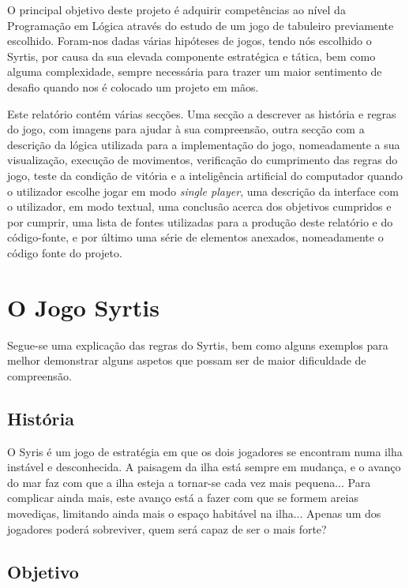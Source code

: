 \documentclass[a4paper]{article}
\begin{document}
O principal objetivo deste projeto é adquirir competências ao nível da Programação em Lógica através do estudo de um jogo de tabuleiro previamente escolhido. Foram-nos dadas várias hipóteses de jogos, tendo nós escolhido o Syrtis, por causa da sua elevada componente estratégica e tática, bem como alguma complexidade, sempre necessária para trazer um maior sentimento de desafio quando nos é colocado um projeto em mãos.

Este relatório contém várias secções. Uma secção a descrever as história e regras do jogo, com imagens para ajudar à sua compreensão, outra secção com a descrição da lógica utilizada para a implementação do jogo, nomeadamente a sua visualização, execução de movimentos, verificação do cumprimento das regras do jogo, teste da condição de vitória e a inteligência artificial do computador quando o utilizador escolhe jogar em modo \textit{single player}, uma descrição da interface com o utilizador, em modo textual, uma conclusão acerca dos objetivos cumpridos e por cumprir, uma lista de fontes utilizadas para a produção deste relatório e do código-fonte, e por último uma série de elementos anexados, nomeadamente o código fonte do projeto.

\section{O Jogo Syrtis}

Segue-se uma explicação das regras do Syrtis, bem como alguns exemplos para melhor demonstrar alguns aspetos que possam ser de maior dificuldade de compreensão.

\subsection{História}

	O Syris é um jogo de estratégia em que os dois jogadores se encontram numa ilha instável e desconhecida. A paisagem da ilha está sempre em mudança, e o avanço do mar faz com que a ilha esteja a tornar-se cada vez mais pequena... Para complicar ainda mais, este avanço está a fazer com que se formem areias movediças, limitando ainda mais o espaço habitável na ilha... Apenas um dos jogadores poderá sobreviver, quem será capaz de ser o mais forte?
	
\subsection{Objetivo}
	
\end{document}
